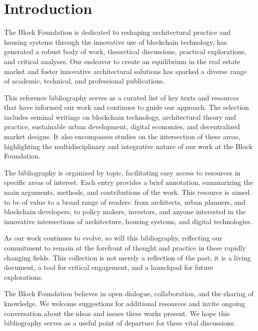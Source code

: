 \section{Introduction}

\label{sec:introduction}

The Block Foundation is dedicated to reshaping architectural practice and housing systems through the innovative use of blockchain technology, has generated a robust body of work, theoretical discussions, practical explorations, and critical analyses. Our endeavor to create an equilibrium in the real estate market and foster innovative architectural solutions has sparked a diverse range of academic, technical, and professional publications.

This reference bibliography serves as a curated list of key texts and resources that have informed our work and continues to guide our approach. The selection includes seminal writings on blockchain technology, architectural theory and practice, sustainable urban development, digital economies, and decentralized market designs. It also encompasses studies on the intersection of these areas, highlighting the multidisciplinary and integrative nature of our work at the Block Foundation.

The bibliography is organized by topic, facilitating easy access to resources in specific areas of interest. Each entry provides a brief annotation, summarizing the main arguments, methods, and contributions of the work. This resource is aimed to be of value to a broad range of readers: from architects, urban planners, and blockchain developers, to policy makers, investors, and anyone interested in the innovative intersections of architecture, housing systems, and digital technologies.

As our work continues to evolve, so will this bibliography, reflecting our commitment to remain at the forefront of thought and practice in these rapidly changing fields. This collection is not merely a reflection of the past; it is a living document, a tool for critical engagement, and a launchpad for future explorations.

The Block Foundation believes in open dialogue, collaboration, and the sharing of knowledge. We welcome suggestions for additional resources and invite ongoing conversation about the ideas and issues these works present. We hope this bibliography serves as a useful point of departure for these vital discussions.
